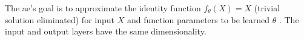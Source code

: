 The \ac{ae}'s goal is to approximate the identity function $f_\theta(X) = X$ (trivial solution eliminated) for input $X$ and 
function parameters to be learned $\theta$ \cite{seminar_ies}.
The input and output layers have the same dimensionality.






